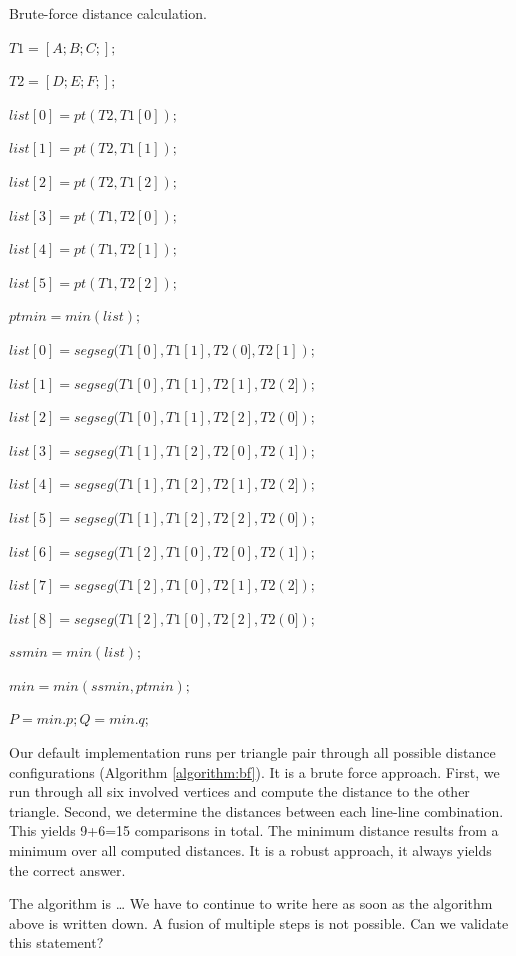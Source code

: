 \begin{algorithm}
 \caption{Brute-force distance calculation.} \label{algorithm:bf}
 \begin{algorithmic}[1]
	
		\State $T1=[A;B;C;];$
		
		\State $T2=[D;E;F;];$

		\State $list[0]= pt(T2, T1[0]);$

		\State $list[1]= pt(T2, T1[1]);$

		\State $list[2]= pt(T2, T1[2]);$

		\State $list[3]= pt(T1, T2[0]);$

		\State $list[4]= pt(T1, T2[1]);$

		\State $list[5]= pt(T1, T2[2]);$

		\State $ptmin = min(list);$

		\State $list[0]=segseg(T1[0],T1[1],T2(0],T2[1]);$

		\State $list[1]=segseg(T1[0],T1[1],T2[1],T2(2]);$

		\State $list[2]=segseg(T1[0],T1[1],T2[2],T2(0]);$

		\State $list[3]=segseg(T1[1],T1[2],T2[0],T2(1]);$

		\State $list[4]=segseg(T1[1],T1[2],T2[1],T2(2]);$

		\State $list[5]=segseg(T1[1],T1[2],T2[2],T2(0]);$

		\State $list[6]=segseg(T1[2],T1[0],T2[0],T2(1]);$

		\State $list[7]=segseg(T1[2],T1[0],T2[1],T2(2]);$

		\State $list[8]=segseg(T1[2],T1[0],T2[2],T2(0]);$

		\State $ssmin = min(list);$

		\State $min = min(ssmin, ptmin);$

		\State $P = min.p; Q = min.q;$
	\EndFunction
 \end{algorithmic}
\end{algorithm} 


%
%
Our default implementation runs per triangle pair through all possible distance
configurations (Algorithm \ref{algorithm:bf}).
It is a brute force approach.
First, we run through all six involved vertices and compute the distance to the
other triangle.
Second, we determine the distances between each line-line combination.
This yields 9+6=15 comparisons in total.
The minimum distance results from a minimum over all computed distances.
It is a robust approach, it always yields the correct answer.


%
%
The algorithm is \ldots
We have to continue to write here as soon as the algorithm above is written
down.
A fusion of multiple steps is not possible. Can we validate this statement?
